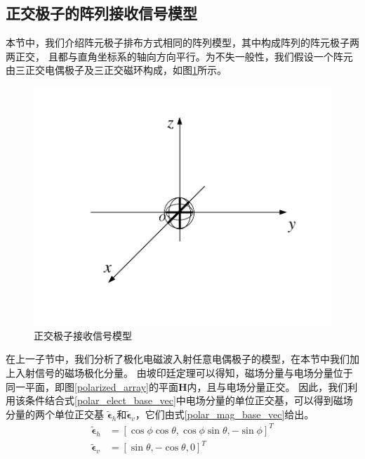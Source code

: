 \documentclass[master]{thesis-uestc}
\begin{document}
\subsection{正交极子的阵列接收信号模型}
本节中，我们介绍阵元极子排布方式相同的阵列模型，其中构成阵列的阵元极子两两正交，
且都与直角坐标系的轴向方向平行。为不失一般性，我们假设一个阵元由三正交电偶极子及三正交磁环构成，如图\ref{ortho_dipole_model}所示。
\begin{figure}[h]
    \includegraphics[scale=0.8]{pic/ortho-dipole.pdf}
    \caption{正交极子接收信号模型}
    \label{ortho_dipole_model}
\end{figure}
在上一子节中，我们分析了极化电磁波入射任意电偶极子的模型，在本节中我们加上入射信号的磁场极化分量。
由坡印廷定理可以得知，磁场分量与电场分量位于同一平面，即图\ref{polarized_array}的平面$\bm{H}$内，且与电场分量正交。
因此，我们利用该条件结合式\eqref{polar_elect_base_vec}中电场分量的单位正交基，可以得到磁场分量的两个单位正交基
$\tilde{\bm{\epsilon}}_h$和$\tilde{\bm{\epsilon}}_v$，它们由式\eqref{polar_mag_base_vec}给出。
\begin{subequations}\label{polar_mag_base_vec}
    \begin{align}
        \tilde{\bm{\epsilon}}_h &= 
        \left[\cos\phi\cos\theta,\cos\phi\sin\theta,-\sin\phi\right]^T \\
        \tilde{\bm{\epsilon}}_v &= 
        \left[\sin\theta,-\cos\theta,0\right]^T
    \end{align}
\end{subequations}
\end{document}
